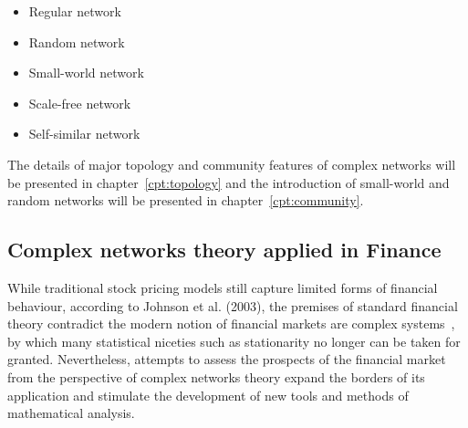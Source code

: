 \begin{itemize}
	\item Regular network
	\item Random network
	\item Small-world network
	\item Scale-free network
	\item Self-similar network
\end{itemize}

The details of major topology and community features of complex networks will be presented in chapter~\ref{cpt:topology} and the introduction of small-world and random networks will be presented in chapter~\ref{cpt:community}.

\subsection{Complex networks theory applied in Finance}
While traditional stock pricing models still capture limited forms of financial behaviour, according to Johnson et al. (2003), the premises of standard financial theory contradict the modern notion of financial markets are complex systems~\cite{financialcomplex}, by which many statistical niceties such as stationarity no longer can be taken for granted. Nevertheless, attempts to assess the prospects of the financial market from the perspective of complex networks theory expand the borders of its application and stimulate the development of new tools and methods of mathematical analysis.

